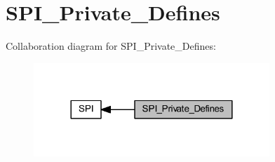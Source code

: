 \hypertarget{group___s_p_i___private___defines}{}\section{S\+P\+I\+\_\+\+Private\+\_\+\+Defines}
\label{group___s_p_i___private___defines}
Collaboration diagram for S\+P\+I\+\_\+\+Private\+\_\+\+Defines\+:
\nopagebreak
\begin{figure}[H]
\begin{center}
\leavevmode
\includegraphics[width=252pt]{group___s_p_i___private___defines}
\end{center}
\end{figure}

